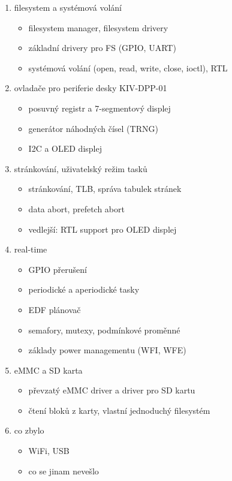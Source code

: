 \documentclass{article}
\begin{document}
\begin{enumerate}
	\item filesystem a systémová volání
	\begin{itemize}
		\item filesystem manager, filesystem drivery
		\item základní drivery pro FS (GPIO, UART)
		\item systémová volání (open, read, write, close, ioctl), RTL
	\end{itemize}

	\item ovladače pro periferie desky KIV-DPP-01
	\begin{itemize}
		\item posuvný registr a 7-segmentový displej
		\item generátor náhodných čísel (TRNG)
		\item I2C a OLED displej
	\end{itemize}

	\item stránkování, uživatelský režim tasků
	\begin{itemize}
		\item stránkování, TLB, správa tabulek stránek
		\item data abort, prefetch abort
		\item vedlejší: RTL support pro OLED displej
	\end{itemize}

	\item real-time
	\begin{itemize}
		\item GPIO přerušení
		\item periodické a aperiodické tasky
		\item EDF plánovač
		\item semafory, mutexy, podmínkové proměnné
		\item základy power managementu (WFI, WFE)
	\end{itemize}

	\item eMMC a SD karta
	\begin{itemize}
		\item převzatý eMMC driver a driver pro SD kartu
		\item čtení bloků z karty, vlastní jednoduchý filesystém
	\end{itemize}

	\item co zbylo
	\begin{itemize}
		\item WiFi, USB
		\item co se jinam nevešlo
	\end{itemize}
\end{enumerate}
\end{document}
